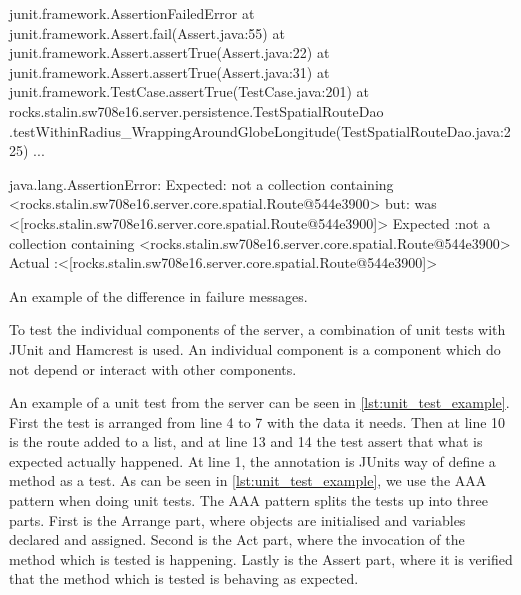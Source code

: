 \begin{listing}
    \begin{java2}
    junit.framework.AssertionFailedError
        at junit.framework.Assert.fail(Assert.java:55)
        at junit.framework.Assert.assertTrue(Assert.java:22)
        at junit.framework.Assert.assertTrue(Assert.java:31)
        at junit.framework.TestCase.assertTrue(TestCase.java:201)
        at rocks.stalin.sw708e16.server.persistence.TestSpatialRouteDao
            .testWithinRadius_WrappingAroundGlobeLongitude(TestSpatialRouteDao.java:225)
        ...

    java.lang.AssertionError: 
    Expected: not a collection containing <rocks.stalin.sw708e16.server.core.spatial.Route@544e3900>
    but: was <[rocks.stalin.sw708e16.server.core.spatial.Route@544e3900]>
    Expected :not a collection containing <rocks.stalin.sw708e16.server.core.spatial.Route@544e3900>
    Actual   :<[rocks.stalin.sw708e16.server.core.spatial.Route@544e3900]>
    \end{java2}
    \caption{An example of the difference in failure messages.}
    \label{lst:assert_diff}
\end{listing}

To test the individual components of the server, 
a combination of unit tests with JUnit and Hamcrest is used.
An individual component is a component which do not depend or interact with other components.

An example of a unit test from the server can be seen in \cref{lst:unit_test_example}.
First the test is arranged from line 4 to 7 with the data it needs.
Then at line 10 is the route added to a list,
and at line 13 and 14 the test assert that what is expected actually happened.
At line 1, the annotation  is JUnits way of define a method as a test.
As can be seen in \cref{lst:unit_test_example}, we use the \ac{AAA} pattern when doing unit tests.
The \ac{AAA} pattern splits the tests up into three parts.
First is the Arrange part, where objects are initialised and variables declared and assigned.
Second is the Act part, where the invocation of the method which is tested is happening.
Lastly is the Assert part, where it is verified that the method which is tested is behaving as expected.\cite{aaa_pattern}

